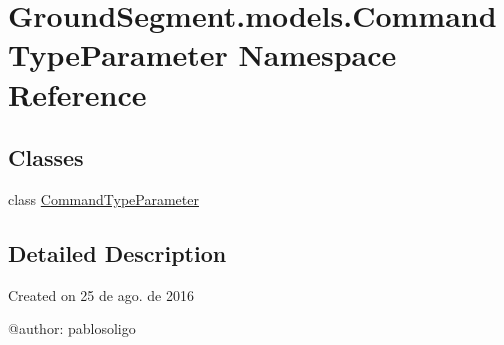 \hypertarget{namespace_ground_segment_1_1models_1_1_command_type_parameter}{}\section{Ground\+Segment.\+models.\+Command\+Type\+Parameter Namespace Reference}
\label{namespace_ground_segment_1_1models_1_1_command_type_parameter}
\subsection*{Classes}
\begin{DoxyCompactItemize}
\item 
class \hyperlink{class_ground_segment_1_1models_1_1_command_type_parameter_1_1_command_type_parameter}{Command\+Type\+Parameter}
\end{DoxyCompactItemize}


\subsection{Detailed Description}
\begin{DoxyVerb}Created on 25 de ago. de 2016

@author: pablosoligo
\end{DoxyVerb}
 